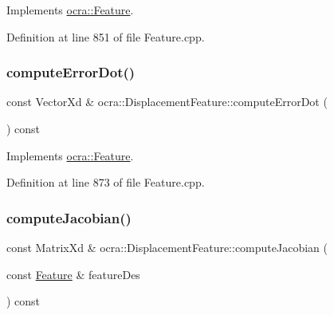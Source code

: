 Implements \hyperlink{classocra_1_1Feature_ac714181e1bb25f878349e299c4ba8c00}{ocra\+::\+Feature}.



Definition at line 851 of file Feature.\+cpp.

\hypertarget{classocra_1_1DisplacementFeature_a684821d2a83945c63661eacdf4bcd262}{}\label{classocra_1_1DisplacementFeature_a684821d2a83945c63661eacdf4bcd262} 
\subsubsection{\texorpdfstring{compute\+Error\+Dot()}{computeErrorDot()}\hspace{0.1cm}{\footnotesize\ttfamily [2/2]}}
{\footnotesize\ttfamily const Vector\+Xd \& ocra\+::\+Displacement\+Feature\+::compute\+Error\+Dot (\begin{DoxyParamCaption}{ }\end{DoxyParamCaption}) const\hspace{0.3cm}{\ttfamily [virtual]}}



Implements \hyperlink{classocra_1_1Feature_a01a4870418ba87d5b41d8f917c1255fc}{ocra\+::\+Feature}.



Definition at line 873 of file Feature.\+cpp.

\hypertarget{classocra_1_1DisplacementFeature_a87b3ef89ea6711a3f953f94e5cdf7e4d}{}\label{classocra_1_1DisplacementFeature_a87b3ef89ea6711a3f953f94e5cdf7e4d} 
\subsubsection{\texorpdfstring{compute\+Jacobian()}{computeJacobian()}\hspace{0.1cm}{\footnotesize\ttfamily [1/2]}}
{\footnotesize\ttfamily const Matrix\+Xd \& ocra\+::\+Displacement\+Feature\+::compute\+Jacobian (\begin{DoxyParamCaption}\item[{const \hyperlink{classocra_1_1Feature}{Feature} \&}]{feature\+Des }\end{DoxyParamCaption}) const\hspace{0.3cm}{\ttfamily [virtual]}}



